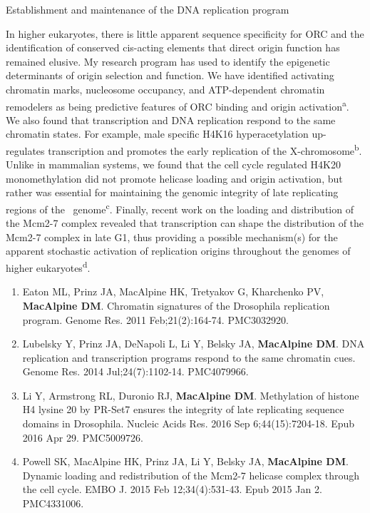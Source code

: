 \item Establishment and maintenance of the \dros DNA replication program

In higher eukaryotes, there is little apparent sequence specificity for ORC and the identification of conserved cis-acting elements that direct origin function has remained elusive.  My research program has used \dros to identify the epigenetic determinants of origin selection and function. We have identified activating chromatin marks, nucleosome occupancy, and ATP-dependent chromatin remodelers as being predictive features of ORC binding and origin activation\textsuperscript{a}. We also found that transcription and DNA replication respond to the same chromatin states.  For example, male specific H4K16 hyperacetylation up-regulates transcription and promotes the early replication of the X-chromosome\textsuperscript{b}.  Unlike in mammalian systems, we found that the cell cycle regulated H4K20 monomethylation did not promote helicase loading and origin activation, but rather was essential for maintaining the genomic integrity of late replicating regions of the \dros\ genome\textsuperscript{c}.  Finally, recent work on the loading and distribution of the Mcm2-7 complex revealed that transcription can shape the distribution of the Mcm2-7 complex in late G1, thus providing a possible mechanism(s) for the apparent stochastic activation of replication origins throughout the genomes of higher eukaryotes\textsuperscript{d}.


\begin{enumerate}
\setlength\itemsep{0.35em}

\item Eaton ML, Prinz JA, MacAlpine HK, Tretyakov G, Kharchenko PV, \textbf{MacAlpine DM}. Chromatin signatures of the Drosophila replication program. Genome Res. 2011 Feb;21(2):164-74. PMC3032920.

\item Lubelsky Y, Prinz JA, DeNapoli L, Li Y, Belsky JA, \textbf{MacAlpine DM}. DNA
replication and transcription programs respond to the same chromatin cues. Genome Res. 2014 Jul;24(7):1102-14. PMC4079966.

\item Li Y, Armstrong RL, Duronio RJ, \textbf{MacAlpine DM}. Methylation of histone H4 lysine 20 by PR-Set7 ensures the integrity of late replicating sequence domains in Drosophila. Nucleic Acids Res. 2016 Sep 6;44(15):7204-18.  Epub 2016 Apr 29. PMC5009726.

\item Powell SK, MacAlpine HK, Prinz JA, Li Y, Belsky JA, \textbf{MacAlpine DM}. Dynamic
loading and redistribution of the Mcm2-7 helicase complex through the cell cycle. EMBO J. 2015 Feb 12;34(4):531-43. Epub 2015 Jan 2. PMC4331006.


\end{enumerate}
